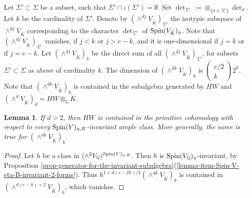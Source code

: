 \documentclass[12pt]{amsart}
\numberwithin{equation}{subsection}
\theoremstyle{plain}
\newtheorem{lem}[thm]{Lemma}
\theoremstyle{definition}
\newcommand{\CC}{{\mathbb C}}
\newcommand{\QQ}{{\mathbb Q}}
\newcommand{\R}{{\mathcal R}}
\newcommand{\Spin}{{\rm Spin}}
\newcommand{\Choose}[2]
{\left(\!\!\begin{array}{c}#1\\#2\end{array}\!\!\right)}
\begin{document}
{Let $\Sigma'\subset\Sigma$ be a subset, such that $\Sigma'\cap\iota(\Sigma')=\emptyset$. 
Set $\det_{\Sigma'}:=\otimes_{\{\sigma\in\Sigma'\}}\det_\sigma.$
Let $k$ be the cardinality of $\Sigma'$.
Denote by $(\wedge^{dj}V_{\tilde{K}})_{\Sigma'}$ the isotypic subspace of $\wedge^{dj}V_{\tilde{K}}$ corresponding to the character $\det_{\Sigma'}$ of
$\Spin(V_{\tilde{K}})_\eta$. Note that $(\wedge^{dj}V_{\tilde{K}})_{\Sigma'}$ vanishes, if $j<k$ or $j>e-k$, and it is one-dimensional if $j=k$ or if $j=e-k$.
Let $(\wedge^{dj}V_{\tilde{K}})_k$ be the direct sum of all $(\wedge^{dj}V_{\tilde{K}})_{\Sigma'}$, for subsets $\Sigma'\subset\Sigma$ as above of cardinality $k$.
The dimension of $(\wedge^{dk}V_{\tilde{K}})_k$ is $\Choose{e/2}{k}2^k$.
Note that $(\wedge^{dk}V_{\tilde{K}})_k$ is contained in the subalgebra generated by $HW$ and 
$(\wedge^{d}V_{\tilde{K}})_d=HW\otimes_\QQ\tilde{K}.$


\begin{lem}
If $d>2$, then $HW$ is contained in the primitive cohomology with respect to every $\Spin(V)_{\eta,B}$-invariant ample class. 
More generally, the same is true for $(\wedge^{dk}V_{\tilde{K}})_k$.
\end{lem}

\begin{proof}
Let $h$ be a class in $(\wedge^2V_\QQ)^{\Spin(V)_{\eta,B}}$. Then $h$ is $\Spin(V_\QQ)_\eta$-invariant, 
by Proposition \ref{prop-generator-for-the-invariant-subalgebra}(\ref{lemma-item-Spin-V-eta-B-invariant-2-forms}).
%
Thus $h^{1+d(e-2k)/2}(\wedge^{dk}V_{\tilde{K}})_k$ is contained in 
$(\wedge^{d(e-k)+2}V_{\tilde{K}})_k$, which vanishes.
\end{proof}


}
\end{document}
